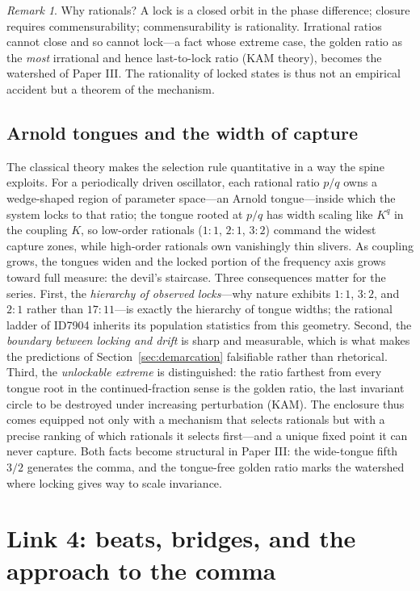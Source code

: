 \documentclass[11pt]{article}
\theoremstyle{remark}
\newtheorem{remark}[theorem]{Remark}
\begin{document}
\begin{remark}
Why rationals? A lock is a closed orbit in the phase difference; closure requires commensurability; commensurability is rationality. Irrational ratios cannot close and so cannot lock---a fact whose extreme case, the golden ratio as the \emph{most} irrational and hence last-to-lock ratio (KAM theory), becomes the watershed of Paper III. The rationality of locked states is thus not an empirical accident but a theorem of the mechanism.
\end{remark}

\subsection{Arnold tongues and the width of capture}

The classical theory makes the selection rule quantitative in a way the spine exploits. For a periodically driven oscillator, each rational ratio $p/q$ owns a wedge-shaped region of parameter space---an Arnold tongue---inside which the system locks to that ratio; the tongue rooted at $p/q$ has width scaling like $K^q$ in the coupling $K$, so low-order rationals ($1{:}1$, $2{:}1$, $3{:}2$) command the widest capture zones, while high-order rationals own vanishingly thin slivers. As coupling grows, the tongues widen and the locked portion of the frequency axis grows toward full measure: the devil's staircase. Three consequences matter for the series. First, the \emph{hierarchy of observed locks}---why nature exhibits $1{:}1$, $3{:}2$, and $2{:}1$ rather than $17{:}11$---is exactly the hierarchy of tongue widths; the rational ladder of ID7904 inherits its population statistics from this geometry. Second, the \emph{boundary between locking and drift} is sharp and measurable, which is what makes the predictions of Section~\ref{sec:demarcation} falsifiable rather than rhetorical. Third, the \emph{unlockable extreme} is distinguished: the ratio farthest from every tongue root in the continued-fraction sense is the golden ratio, the last invariant circle to be destroyed under increasing perturbation (KAM). The enclosure thus comes equipped not only with a mechanism that selects rationals but with a precise ranking of which rationals it selects first---and a unique fixed point it can never capture. Both facts become structural in Paper III: the wide-tongue fifth $3/2$ generates the comma, and the tongue-free golden ratio marks the watershed where locking gives way to scale invariance.

\section{Link 4: beats, bridges, and the approach to the comma}
\label{sec:comma}
\end{document}
